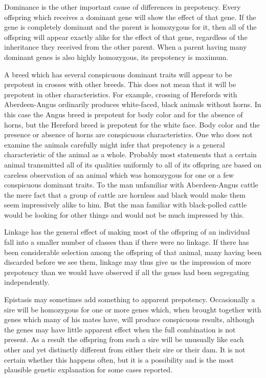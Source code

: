 Dominance is the other important cause of differences in prepotency.
Every offspring which receives a dominant gene will show the
effect of that gene. If the gene is completely dominant and the parent is
homozygous for it, then all of the offspring will appear exactly alike for
the effect of that gene, regardless of the inheritance they received from
the other parent. When a parent having many dominant genes is also
highly homozygous, its prepotency is maximum.

A breed which has several conspicuous dominant traits will appear
to be prepotent in crosses with other breeds. This does not mean that it
will be prepotent in other characteristics. For example, crossing of
Herefords with Aberdeen-Angus ordinarily produces white-faced,
black animals without horns. In this case the Angus breed is prepotent
for body color and for the absence of horns, but the Hereford breed is
prepotent for the white face. Body color and the presence or absence of
horns are conspicuous characteristics. One who does not examine the
animals carefully might infer that prepotency is a general characteristic
of the animal as a whole. Probably most statements that a certain animal
transmitted all of its qualities uniformly to all of its offspring are
based on careless observation of an animal which was homozygous for
one or a few conspicuous dominant traits. To the man unfamiliar with
Aberdeen-Angus cattle the mere fact that a group of cattle are hornless
and black would make them seem impressively alike to him. But the
man familiar with black-polled cattle would be looking for other things
and would not be much impressed by this.

Linkage has the general effect of making most of the offspring of an
individual fall into a smaller number of classes than if there were no
linkage. If there has been considerable selection among the offspring
of that animal, many having been discarded before we see them, linkage
may thus give us the impression of more prepotency than we would
have observed if all the genes had been segregating independently.

Epistasis may sometimes add something to apparent prepotency.
Occasionally a sire will be homozygous for one or more genes which,
when brought together with genes which many of his mates have, will
produce conspicuous results, although the genes may have little apparent
effect when the full combination is not present. As a result the offspring
from such a sire will be unusually like each other and yet
distinctly different from either their sire or their dam. It is not certain
whether this happens often, but it is a possibility and is the most plausible
genetic explanation for some cases reported.

